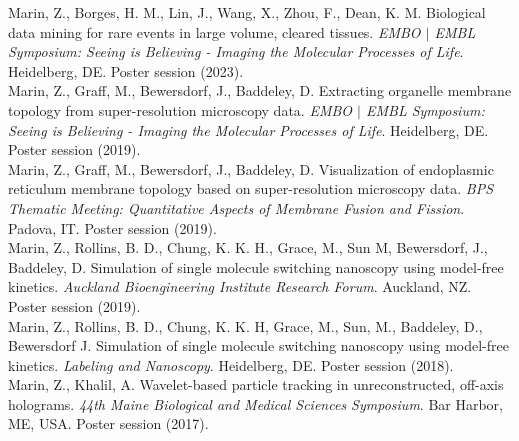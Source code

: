  {
Marin, Z., Borges, H. M., Lin, J., Wang, X., Zhou, F., Dean, K. M. Biological data mining for rare events in large volume, cleared tissues. \emph{EMBO $|$ EMBL Symposium: Seeing is Believing - Imaging the Molecular Processes of Life}. Heidelberg, DE. Poster session (2023). \\

Marin, Z., Graff, M., Bewersdorf, J., Baddeley, D. Extracting organelle membrane topology from super-resolution microscopy data. \emph{EMBO $|$ EMBL Symposium: Seeing is Believing - Imaging the Molecular Processes of Life}. Heidelberg, DE. Poster session (2019). \\

Marin, Z., Graff, M., Bewersdorf, J., Baddeley, D. Visualization of endoplasmic reticulum membrane topology based on super-resolution microscopy data. \emph{BPS Thematic Meeting: Quantitative Aspects of Membrane Fusion and Fission}. Padova, IT. Poster session (2019). \\

Marin, Z., Rollins, B. D., Chung, K. K. H., Grace, M., Sun M, Bewersdorf, J., Baddeley, D. Simulation of single molecule switching nanoscopy using model-free kinetics. \emph{Auckland Bioengineering Institute Research Forum}. Auckland, NZ. Poster session (2019). \\

Marin, Z., Rollins, B. D., Chung, K. K. H, Grace, M., Sun, M., Baddeley, D., Bewersdorf J. Simulation of single molecule switching nanoscopy using model-free kinetics. \emph{Labeling and Nanoscopy}. Heidelberg, DE. Poster session (2018). \\

Marin, Z., Khalil, A. Wavelet-based particle tracking in unreconstructed, off-axis holograms. \emph{44th Maine Biological and Medical Sciences Symposium}. Bar Harbor, ME, USA. Poster session (2017). \\
}

\vspace{11pt}
